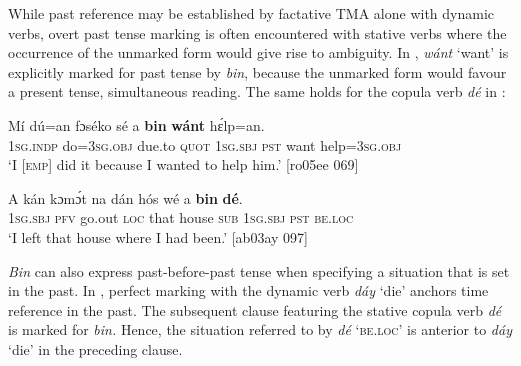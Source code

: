 While past reference may be established by factative TMA alone with dynamic verbs, overt past tense marking is often encountered with stative verbs where the occurrence of the unmarked form would give rise to ambiguity. In , \textit{wánt} ‘want’ is explicitly marked for past tense by \textit{bin}, because the unmarked form would favour a present tense, simultaneous reading. The same holds for the copula verb \textit{dé} in : 



\ea%
    \label{ex:key:382}
    \gll Mí    dú=an    fɔséko  sé    a    \textbf{bin}  \textbf{wánt}  hɛ́lp=an.\\
\textsc{1sg.indp}  do=\textsc{3sg.obj}  due.to  \textsc{quot}    \textsc{1sg.sbj}  \textsc{pst}  want  help=\textsc{3sg.obj}\\

\glt ‘I \textsc{[emp]} did it because I wanted to help him.’ [ro05ee 069]
\z


\ea%
    \label{ex:key:383}
    \gll \MakeUppercase{A}   kán  kɔmɔ́t  na  dán    hós    wé  a    \textbf{bin} \textbf{dé}.\\
\textsc{1sg.sbj}  \textsc{pfv}  go.out  \textsc{loc}  that    house  \textsc{sub}  \textsc{1sg.sbj}  \textsc{pst}  \textsc{be.loc}\\

\glt ‘I left that house where I had been.’ [ab03ay 097]
\z

\textit{Bin} can also express past-before-past tense when specifying a situation that is set in the past. In , perfect marking with the dynamic verb \textit{dáy} ‘die’ anchors time reference in the past. The subsequent clause  featuring the stative copula verb \textit{dé} is marked for \textit{bin.} Hence, the situation referred to by \textit{dé} \textsc{‘be.loc’} is anterior to \textit{dáy} ‘die’ in the preceding clause. 


\ea%
    \label{ex:key:384}
\z
\z

